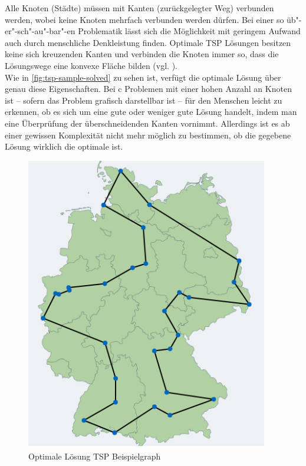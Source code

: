 \documentclass[12pt,a4paper]{scrreprt}
\newcommand{\absatz}{\\[12pt]}
\begin{document}
Alle Knoten (Städte) müssen mit Kanten (zurückgelegter Weg) verbunden werden, wobei keine Knoten mehrfach verbunden werden dürfen. Bei einer so üb"-er"-sch"-au"-bar"-en Problematik lässt sich die Möglichkeit mit geringem Aufwand auch durch menschliche Denkleistung finden. Optimale TSP Lösungen besitzen keine sich kreuzenden Kanten und verbinden die Knoten immer so, dass die Lösungswege eine konvexe Fläche bilden (vgl. \cite{groetschel05}).\absatz
Wie in \autoref{fig:tsp-sample-solved} zu sehen ist, verfügt die optimale Lösung über genau diese Eigenschaften. Bei c Problemen mit einer hohen Anzahl an Knoten ist -- sofern das Problem grafisch darstellbar ist -- für den Menschen leicht zu erkennen, ob es sich um eine gute oder weniger gute Lösung handelt, indem man eine Überprüfung der überschneidenden Kanten vornimmt. Allerdings ist es ab einer gewissen Komplexität nicht mehr möglich zu bestimmen, ob die gegebene Lösung wirklich die optimale ist.
\pagebreak

\begin{figure}[ht]
  	\centering
	\includegraphics[width=300pt]{images/tsp_sample_solved.png}
	\caption{Optimale Lösung TSP Beispielgraph\protect\footnotemark}
	\label{fig:tsp-sample-solved}
\end{figure}
\end{document}
